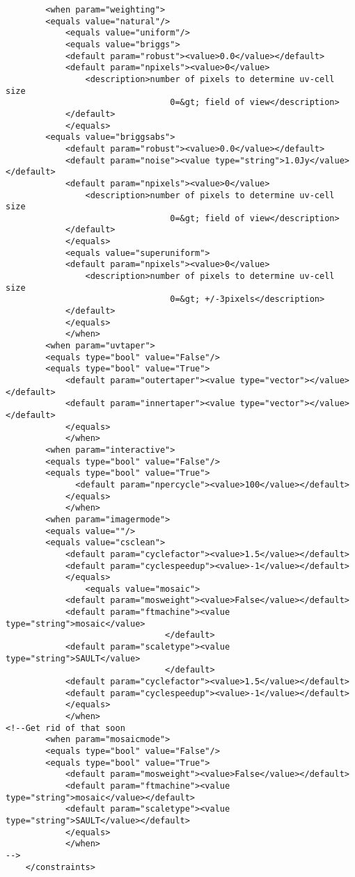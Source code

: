 \begin{verbatim}
	    <when param="weighting">
		<equals value="natural"/>
	        <equals value="uniform"/>
	        <equals value="briggs">
			<default param="robust"><value>0.0</value></default>
			<default param="npixels"><value>0</value>
			    <description>number of pixels to determine uv-cell size
                                 0=&gt; field of view</description>
		    </default>
	        </equals>
		<equals value="briggsabs">
			<default param="robust"><value>0.0</value></default>
			<default param="noise"><value type="string">1.0Jy</value></default>
			<default param="npixels"><value>0</value>
			    <description>number of pixels to determine uv-cell size
                                 0=&gt; field of view</description>
		    </default>
	        </equals>
	        <equals value="superuniform">
			<default param="npixels"><value>0</value>
			    <description>number of pixels to determine uv-cell size
                                 0=&gt; +/-3pixels</description>
		    </default>
	        </equals>
            </when>
	    <when param="uvtaper">
		<equals type="bool" value="False"/>
		<equals type="bool" value="True">
			<default param="outertaper"><value type="vector"></value></default>
			<default param="innertaper"><value type="vector"></value></default>
	        </equals>
            </when>
	    <when param="interactive">
		<equals type="bool" value="False"/>
		<equals type="bool" value="True">
		      <default param="npercycle"><value>100</value></default>
	        </equals>
            </when>
	    <when param="imagermode">
		<equals value=""/>
		<equals value="csclean">
			<default param="cyclefactor"><value>1.5</value></default>
			<default param="cyclespeedup"><value>-1</value></default>
	        </equals>
                <equals value="mosaic">
			<default param="mosweight"><value>False</value></default>
			<default param="ftmachine"><value type="string">mosaic</value>
                                </default>
			<default param="scaletype"><value type="string">SAULT</value>
                                </default>
			<default param="cyclefactor"><value>1.5</value></default>
			<default param="cyclespeedup"><value>-1</value></default>
	        </equals>
            </when>
<!--Get rid of that soon
	    <when param="mosaicmode">
		<equals type="bool" value="False"/>
		<equals type="bool" value="True">
			<default param="mosweight"><value>False</value></default>
			<default param="ftmachine"><value type="string">mosaic</value></default>
			<default param="scaletype"><value type="string">SAULT</value></default>
	        </equals>
            </when>
-->
    </constraints>


\end{verbatim}
